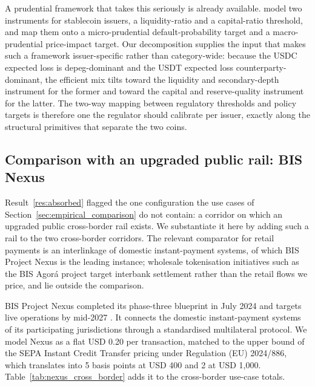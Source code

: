 A prudential framework that takes this seriously is already available. \citet{goel_lewrick_agarwal_2026} model two instruments for stablecoin issuers, a liquidity-ratio and a capital-ratio threshold, and map them onto a micro-prudential default-probability target and a macro-prudential price-impact target. Our decomposition supplies the input that makes such a framework issuer-specific rather than category-wide: because the USDC expected loss is depeg-dominant and the USDT expected loss counterparty-dominant, the efficient mix tilts toward the liquidity and secondary-depth instrument for the former and toward the capital and reserve-quality instrument for the latter. The two-way mapping between regulatory thresholds and policy targets is therefore one the regulator should calibrate per issuer, exactly along the structural primitives that separate the two coins.

\subsection{Comparison with an upgraded public rail: BIS Nexus}\label{sub:public_trajectory}

Result~\ref{res:absorbed} flagged the one configuration the use cases of Section~\ref{sec:empirical_comparison} do not contain: a corridor on which an upgraded public cross-border rail exists. We substantiate it here by adding such a rail to the two cross-border corridors. The relevant comparator for retail payments is an interlinkage of domestic instant-payment systems, of which BIS Project Nexus is the leading instance; wholesale tokenisation initiatives such as the BIS Agor\'a project target interbank settlement rather than the retail flows we price, and lie outside the comparison.

BIS Project Nexus completed its phase-three blueprint in July 2024 and targets live operations by mid-2027 \citep{bis_nexus_2024}. It connects the domestic instant-payment systems of its participating jurisdictions through a standardised multilateral protocol. We model Nexus as a flat USD 0.20 per transaction, matched to the upper bound of the SEPA Instant Credit Transfer pricing under Regulation (EU) 2024/886, which translates into 5 basis points at USD 400 and 2 at USD 1{,}000. Table~\ref{tab:nexus_cross_border} adds it to the cross-border use-case totals.

